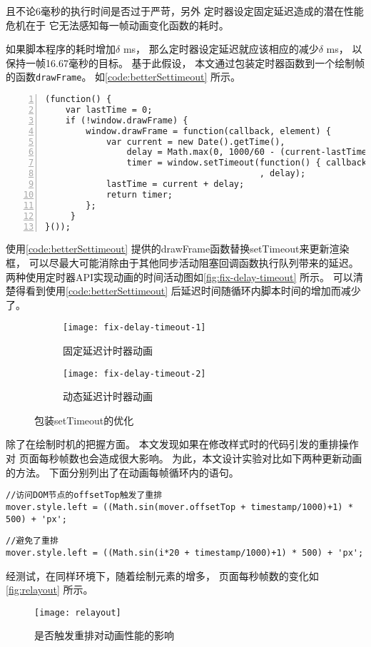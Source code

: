 且不论6毫秒的执行时间是否过于严苛，另外
定时器设定固定延迟造成的潜在性能危机在于
它无法感知每一帧动画变化函数的耗时。

如果脚本程序的耗时增加$\delta$ ms，
那么定时器设定延迟就应该相应的减少$\delta$ ms，
以保持一帧16.67毫秒的目标。
基于此假设，
本文通过包装定时器函数到一个绘制帧的函数\texttt{drawFrame}。
如\autoref{code:betterSettimeout} 所示。
\begin{lstlisting}[numbers=left, numberstyle=\tiny, label=code:betterSettimeout]
(function() {
    var lastTime = 0;
    if (!window.drawFrame) {
        window.drawFrame = function(callback, element) {
            var current = new Date().getTime(),
                delay = Math.max(0, 1000/60 - (current-lastTime)),
                timer = window.setTimeout(function() { callback(current+delay); }
                                          , delay);
            lastTime = current + delay;
            return timer;
        };
     }
}());
\end{lstlisting}
使用\autoref{code:betterSettimeout} 提供的drawFrame函数替换setTimeout来更新渲染框，
可以尽最大可能消除由于其他同步活动阻塞回调函数执行队列带来的延迟。
两种使用定时器API实现动画的时间活动图如\autoref{fig:fix-delay-timeout} 所示。
可以清楚得看到使用\autoref{code:betterSettimeout} 后延迟时间随循环内脚本时间的增加而减少了。
\begin{figure}[htbp]
	\centering
    \begin{subfigure}[b]{.45\textwidth}
        \centering
	    \texttt{[image: fix-delay-timeout-1]}
        \caption{固定延迟计时器动画}\label{fig:gpu-or-not-1}
    \end{subfigure}
    \begin{subfigure}[b]{.45\textwidth}
        \centering
	    \texttt{[image: fix-delay-timeout-2]}
        \caption{动态延迟计时器动画}\label{fig:gpu-or-not-2}
    \end{subfigure}
    \caption{包装setTimeout的优化}\label{fig:fix-delay-timeout}
\end{figure}


除了在绘制时机的把握方面。
本文发现如果在修改样式时的代码引发的重排操作对
页面每秒帧数也会造成很大影响。
为此，本文设计实验对比如下两种更新动画的方法。
下面分别列出了在动画每帧循环内的语句。
\begin{lstlisting}
//访问DOM节点的offsetTop触发了重排
mover.style.left = ((Math.sin(mover.offsetTop + timestamp/1000)+1) * 500) + 'px';
\end{lstlisting}
\begin{lstlisting}
//避免了重排
mover.style.left = ((Math.sin(i*20 + timestamp/1000)+1) * 500) + 'px';
\end{lstlisting}
经测试，在同样环境下，随着绘制元素的增多，
页面每秒帧数的变化如\autoref{fig:relayout} 所示。
\begin{figure}[htbp]
	\centering
	\texttt{[image: relayout]}
	\caption{是否触发重排对动画性能的影响}\label{fig:relayout}
\end{figure}

